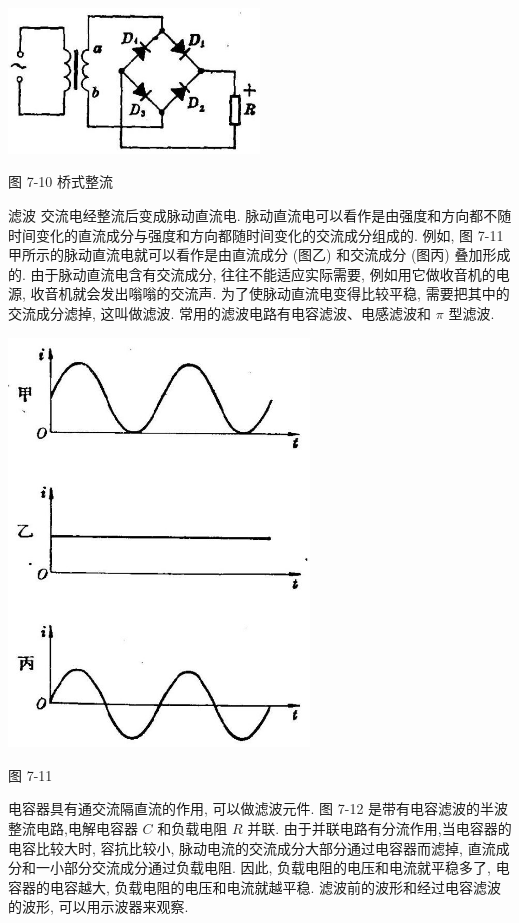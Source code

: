 \documentclass[10pt]{article}
\begin{document}
\begin{center}
\includegraphics[max width=0.5\textwidth]{images/01913056-1f15-74d8-9184-9aab52c9d66b_227_331076.jpg}
\end{center}

图 7-10 桥式整流

滤波 交流电经整流后变成脉动直流电. 脉动直流电可以看作是由强度和方向都不随时间变化的直流成分与强度和方向都随时间变化的交流成分组成的. 例如, 图 7-11 甲所示的脉动直流电就可以看作是由直流成分 (图乙) 和交流成分 (图丙) 叠加形成的. 由于脉动直流电含有交流成分, 往往不能适应实际需要, 例如用它做收音机的电源, 收音机就会发出嗡嗡的交流声. 为了使脉动直流电变得比较平稳, 需要把其中的交流成分滤掉, 这叫做滤波. 常用的滤波电路有电容滤波、电感滤波和 \(\pi\) 型滤波.

\begin{center}
\includegraphics[max width=0.6\textwidth]{images/01913056-1f15-74d8-9184-9aab52c9d66b_228_488153.jpg}
\end{center}

图 7-11

电容器具有通交流隔直流的作用, 可以做滤波元件. 图 7-12 是带有电容滤波的半波整流电路,电解电容器 \(C\) 和负载电阻 \(R\) 并联. 由于并联电路有分流作用,当电容器的电容比较大时, 容抗比较小, 脉动电流的交流成分大部分通过电容器而滤掉, 直流成分和一小部分交流成分通过负载电阻. 因此, 负载电阻的电压和电流就平稳多了, 电容器的电容越大, 负载电阻的电压和电流就越平稳. 滤波前的波形和经过电容滤波的波形, 可以用示波器来观察.
\end{document}
